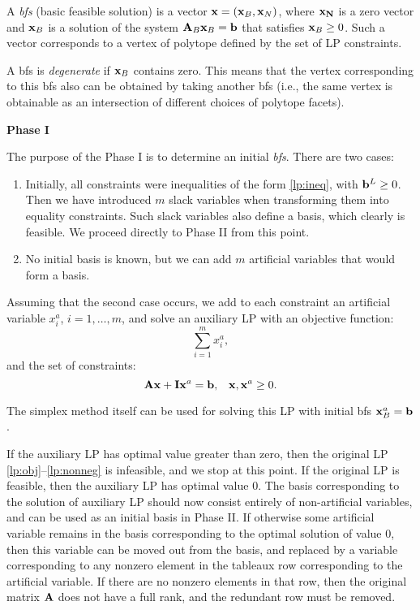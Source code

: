 \documentclass[10pt]{article}
\begin{document}
A {\em bfs} (basic feasible solution) is a vector ${\bf x} = ({\bf x}_B, {\bf x}_N)$, where ${\bf x_N}$ is a zero vector and ${\bf x}_B$ is a solution of the system ${\bf A}_B {\bf x}_B = {\bf b}$ that satisfies ${\bf x}_B \geq 0$. Such a vector corresponds to a vertex of polytope defined by the set of LP constraints.

A bfs is {\em degenerate} if ${\bf x}_B$ contains zero. This means that the vertex corresponding to this bfs also can be obtained by taking another bfs (i.e., the same vertex is obtainable as an intersection of different choices of polytope facets).


\medskip
{\bf Phase I}

The purpose of the Phase I is to determine an initial {\em bfs}. There are two cases:
\begin{enumerate}
    \item Initially, all constraints were inequalities of the form \eqref{lp:ineq}, with ${\bf b}^L \geq 0$. Then we have introduced $m$ slack variables when transforming them into equality constraints. Such slack variables also define a basis, which clearly is feasible. We proceed directly to Phase II from this point.
    \item No initial basis is known, but we can add $m$ artificial variables that would form a basis.
\end{enumerate}

Assuming that the second case occurs, we add to each constraint an artificial variable $x^{a}_i$, $i = 1, \ldots, m$, and solve an auxiliary LP with an objective function:
$$
    \sum_{i=1}^m x^{a}_i,
$$
and the set of constraints:
$$
    {\bf A} {\bf x} + {\bf I} {\bf x}^a = {\bf b}, \;\;\; {\bf x}, {\bf x}^a \geq 0.
$$

The simplex method itself can be used for solving this LP with initial bfs ${\bf x}^a_B = {\bf b}$.

If the auxiliary LP has optimal value greater than zero, then the original LP \eqref{lp:obj}--\eqref{lp:nonneg} is infeasible, and we stop at this point.
If the original LP is feasible, then the auxiliary LP has optimal value $0$. The basis corresponding to the solution of auxiliary LP should now consist entirely of non-artificial variables, and can be used as an initial basis in Phase II. If otherwise some artificial variable remains in the basis corresponding to the optimal solution of value $0$, then this variable can be moved out from the basis, and replaced by a variable corresponding to any nonzero element in the tableaux row corresponding to the artificial variable. If there are no nonzero elements in that row, then the original matrix ${\bf A}$ does not have a full rank, and the redundant row must be removed.
\end{document}
